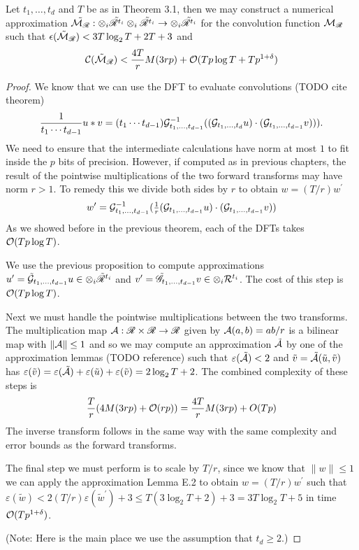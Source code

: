 \begin{proposition}
    Let $t_1, \ldots, t_d$ and $T$ be as in Theorem 3.1, then we may construct a numerical approximation $\tilde{\mathcal M_{\mathscr{R}}}: \otimes_i \tilde{\mathscr{R}^{t_i}} \otimes_i \tilde{\mathscr{R}^{t_i}} \to \otimes_i \tilde{\mathscr{R}^{t_i}}$ for the convolution function $\mathcal M_{\mathscr{R}}$ such that $\epsilon(\tilde{\mathcal M}_{\mathscr{R}}) < 3T \log_2 T + 2T + 3$ and
    \[
        \mathcal C(\tilde{\mathcal M}_{\mathscr{R}}) < \frac{4T}{r}M(3rp) + \mathcal O(Tp \log T + T p^{1 + \delta})
    \]
\end{proposition}

\begin{proof}
    We know that we can use the DFT to evaluate convolutions (TODO cite theorem)
    \[
        \frac{1}{t_1 \cdots t_{d-1}}u \ast v = (t_1 \cdots t_{d-1})\mathcal G^{-1}_{t_1, \ldots, t_{d-1}}((\mathcal G_{t_1, \ldots, t_d}u)\cdot (\mathcal G_{t_1, \ldots, t_{d-1}} v))).
    \]
    We need to ensure that the intermediate calculations have norm at most $1$ to fit inside the $p$ bits of precision. However, if computed as in previous chapters, the result of the pointwise multiplications of the two forward transforms may have norm $r > 1$. To remedy this we divide both sides by $r$ to obtain $w = (T/r)w^\prime$
    \[
        w^\prime = \mathcal G^{-1}_{t_1, \ldots, t_{d-1}}(\tfrac{1}{r}(\mathcal G_{t_1, \ldots, t_{d-1}}u) \cdot (\mathcal G_{t_1, \ldots, t_{d-1}}v))
    \]
    As we showed before in the previous theorem, each of the DFTs takes $\mathcal O(Tp\log T)$.

    We use the previous proposition to compute approximations $u^\prime = \tilde{\mathcal G}_{t_1, \ldots, t_{d-1}} u \in \otimes_i \tilde{\mathscr{R}}^{t_i}$ and $v^\prime = \tilde{\mathscr{G}}_{t_1, \ldots, t_{d-1}} v \in \otimes_i \mathcal R^{t_i}$. The cost of this step is $\mathcal O(Tp \log T)$.

    Next we must handle the pointwise multiplications between the two transforms. The multiplication map $\mathcal A: \mathscr{R} \times \mathscr{R} \to \mathscr{R}$ given by $\mathcal A(a, b) = ab/r$ is a bilinear map with $\|\mathcal A\| \le 1$ and so we may compute an approximation $\tilde{\mathcal A}$ by one of the approximation lemmas (TODO reference) such that $\varepsilon(\tilde{\mathcal A}) < 2$ and $\tilde{v} = \tilde{\mathcal A}(\tilde{u}, \tilde{v})$ has $\varepsilon(\tilde{v}) = \varepsilon(\tilde{\mathcal A}) + \varepsilon(\tilde{u}) + \varepsilon(\tilde{v}) = 2\log_2 T + 2$. The combined complexity of these steps is
    \[
        \frac{T}{r}(4M(3rp) + \mathcal O(rp)) = \frac{4T}{r} M(3rp) + O(Tp)
    \]
    The inverse transform follows in the same way with the same complexity and error bounds as the forward transforms.

    The final step we must perform is to scale by $T/r$, since we know that $\|w\| \le 1$ we can apply the approximation Lemma E.2 to obtain $w = (T/r)w^\prime$ such that $\varepsilon(\tilde{w}) < 2(T/r)\varepsilon(\tilde{w}^\prime) + 3 \le T(3 \log_2 T + 2) + 3 = 3T\log_2 T + 5$ in time $\mathcal O(Tp^{1 + \delta})$.

    (Note: Here is the main place we use the assumption that $t_d \ge 2$.)
\end{proof}


